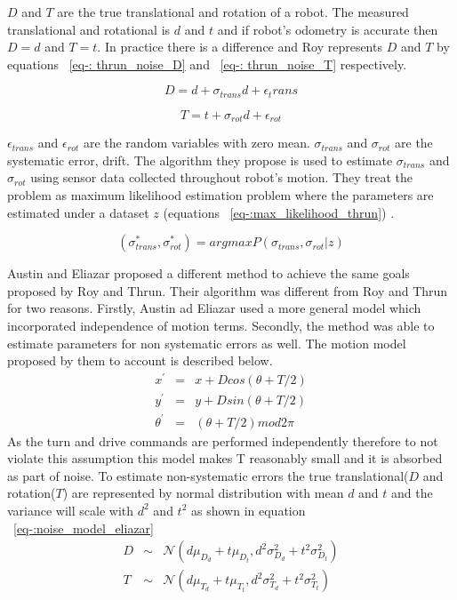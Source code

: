 \documentclass[12pt]{dalcsthesis}
\begin{document}
$D$ and $T$ are the true translational and rotation of a robot. The measured translational and rotational is $d$ and $t$ and if robot's odometry is accurate then $D=d$ and $T=t$. In practice there is a difference and Roy represents $D$ and $T$ by equations ~\ref{eq-: thrun_noise_D} and ~\ref{eq-: thrun_noise_T} respectively.

\begin{equation}
\label{eq-: thrun_noise_D}
D= d+ \sigma_{trans}d+\epsilon_trans
\end{equation}

\begin{equation}
\label{eq-: thrun_noise_T}
  T= t+ \sigma_{rot}d+\epsilon_{rot}
\end{equation}

$\epsilon_{trans}$ and $\epsilon_{rot}$ are the random variables with zero mean. $\sigma_{trans}$ and $\sigma_{rot}$ are the systematic error, drift.  The algorithm they propose is used to estimate $\sigma_{trans}$ and $\sigma_{rot}$ using sensor data collected throughout robot's motion. They treat the problem as maximum likelihood estimation problem where the parameters are estimated under a dataset $z$ (equations ~\ref{eq-:max_likelihood_thrun}) .

\begin{equation}
\label{eq-:max_likelihood_thrun}
 (\sigma_{trans}^{*},\sigma_{rot}^{*}) = argmax P(\sigma_{trans},\sigma_{rot}|z)
\end{equation}

Austin and Eliazar \cite{Eliazar2004} proposed a different method to achieve the same goals proposed by Roy and Thrun. Their algorithm was different from Roy and Thrun for two reasons. Firstly, Austin ad Eliazar used a more general model which incorporated independence of motion terms. Secondly, the method was able to estimate parameters for non systematic errors as well. 
The motion model proposed by them to account is described below.
\begin{equation}
	\begin{aligned}
	x^{'}&=&x+Dcos(\theta+T/2) \\
	y^{'}&=&y+Dsin(\theta+T/2) \\
	\theta^{'}&=&(\theta+T/2)mod2\pi
	\end{aligned}
\end{equation}
As the turn and drive commands are performed independently therefore to not violate this assumption this model makes T reasonably small and it is absorbed as part of noise. To estimate non-systematic errors the true translational($D$ and rotation($T$) are represented by normal distribution with mean $d$ and $t$ and the variance will scale with $d^2$ and $t^2$ as shown in equation ~\ref{eq-:noise_model_eliazar}
\begin{equation}
\label{eq-:noise_model_eliazar}
\begin{aligned}
D &\sim& \mathcal{{N}}(d\mu_{D_{d}}+t\mu_{D_{t}},d^2\sigma_{D_{d}}^2+t^2\sigma_{D_{t}}^2)\\
T &\sim& \mathcal{{N}}(d\mu_{T_{d}}+t\mu_{T_{t}},d^2\sigma_{T_{d}}^2+t^2\sigma_{T_{t}}^2)
\end{aligned}
\end{equation}
\end{document}

